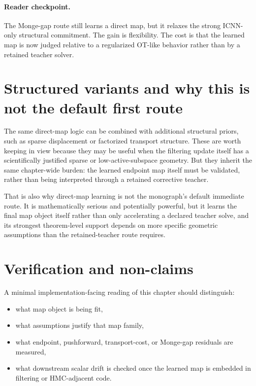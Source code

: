 \paragraph{Reader checkpoint.}
The Monge-gap route still learns a direct map, but it relaxes the strong
ICNN-only structural commitment.  The gain is flexibility.  The cost is that
the learned map is now judged relative to a regularized OT-like behavior rather
than by a retained teacher solver.

\section{Structured variants and why this is not the default first route}
\label{sec:bf-neural-ot-direct-structured}
\label{sec:bf-neural-ot-direct-why-not-default}

The same direct-map logic can be combined with additional structural priors, such
as sparse displacement or factorized transport structure.  These are worth
keeping in view because they may be useful when the filtering update itself has a
scientifically justified sparse or low-active-subspace geometry.  But they
inherit the same chapter-wide burden: the learned endpoint map itself must be
validated, rather than being interpreted through a retained corrective teacher.

That is also why direct-map learning is not the monograph’s default immediate
route.  It is mathematically serious and potentially powerful, but it learns the
final map object itself rather than only accelerating a declared teacher solve,
and its strongest theorem-level support depends on more specific geometric
assumptions than the retained-teacher route requires.

\section{Verification and non-claims}
\label{sec:bf-neural-ot-direct-verification}

A minimal implementation-facing reading of this chapter should distinguish:
\begin{itemize}
  \item what map object is being fit,
  \item what assumptions justify that map family,
  \item what endpoint, pushforward, transport-cost, or Monge-gap residuals are
  measured,
  \item what downstream scalar drift is checked once the learned map is embedded
  in filtering or HMC-adjacent code.
\end{itemize}


